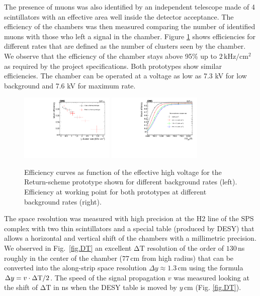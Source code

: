 \documentclass{PoS}
\newcommand{\khzcm}{\mathrm{kHz/cm^2}}
\newcommand{\DT}{\mathrm{\Delta T}}
\begin{document}
The presence of muons was also identified by an independent telescope made of 4 scintillators with an effective area well inside the detector acceptance. The efficiency of the chambers was then measured comparing the number of identified muons with those who left a signal in the chamber. Figure \ref{fig.eff} shows efficiencies for different rates that are defined as the number of clusters seen by the chamber. We observe that the efficiency of the chamber stays above 95\% up to $2\,\khzcm$ as required by the project specifications. Both prototypes show similar efficiencies. The chamber can be operated at a voltage as low as 7.3 kV for low background and 7.6 kV for maximum rate.


\begin{figure}
  \begin{center}
    \includegraphics[width=0.40\textwidth]{figs/RETURN_EFFvsRATE.pdf}
    \includegraphics[width=0.40\textwidth]{figs/R_EFFvsHV.pdf}
  \end{center}
 \caption{Efficiency curves as function of the effective high voltage for the Return-scheme prototype shown for different background rates (left). Efficiency at working point for both prototypes at different background rates (right).} \label{fig.eff}
\end{figure}


The space resolution was measured with high precision at the H2 line of the SPS complex with two thin scintillators and a special table (produced by DESY) that allows a horizontal and vertical shift of the chambers with a millimetric precision. We observed in Fig.~\ref{fig.DT} an excellent $\DT$ resolution of the order of $130$\,ns roughly in the center of the chamber ($77$\,cm from high radius) that can be converted into the along-strip space resolution $\Delta y \approx 1.3$\,cm using the formula $\Delta y = v \cdot \Delta {\rm T} / 2$. The speed of the signal propagation $v$ was measured looking at the shift of $\DT$ in ns when the DESY table is moved by $y$\,cm (Fig. \ref{fig.DT}).
\end{document}
